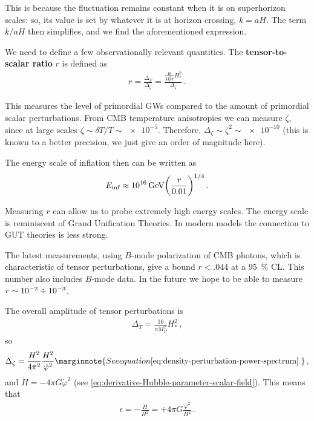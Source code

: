 \documentclass[main.tex]{subfiles}
\begin{document}
This is because the fluctuation remains constant when it is on superhorizon scales: so, its value is set by whatever it is at horizon crossing, \(k = aH\).
The term \(k / aH\) then simplifies, and we find the aforementioned expression.

We need to define a few observationally relevant quantities. 
The \textbf{tensor-to-scalar ratio} \(r\) is defined as 
%
\begin{align}
r = \frac{\Delta _T}{\Delta _\zeta }
= \frac{ \frac{16}{M_P^2 \pi } H^2_*}{\Delta _\zeta }
\,.
\end{align}

This measures the level of primordial GWs compared to the amount of primordial scalar perturbations. 
From CMB temperature anisotropies we can measure \(\zeta \), since at large scales \(\zeta \sim \delta T / T \sim \num{e-5}\). Therefore, \(\Delta_\zeta \sim \zeta^2 \sim \num{e-10}\) (this is known to a better precision, we just give an order of magnitude here).

The energy scale of inflation then can be written as 
%
\begin{align}
E _{\text{inf}} \approx \SI{e16}{GeV} \qty(\frac{r}{\num{.01}})^{1/4}
\,.
\end{align}

Measuring \(r\) can allow us to probe extremely high energy scales.
The energy scale is reminiscent of Grand Unification Theories. 
In modern models the connection to GUT theories is less strong.

The latest measurements, using \(B\)-mode polarization of CMB photons, which is characteristic of tensor perturbations, give a bound \(r < \num{.044}\) at a \SI{95}{\percent} CL. This number also includes \(B\)-mode data.
In the future we hope to be able to measure \(r \sim \num{e-2} \divisionsymbol \num{e-3}\). 

The overall amplitude of tensor perturbations is 
%
\begin{align}
\Delta _T = \frac{16}{\pi M_P^2} H^2_*
\,,
\end{align}
%
so 
%
\begin{align}
\Delta_{\zeta } = \frac{H^2}{4 \pi^2} \frac{H^2}{\dot{\varphi}^2} 
\marginnote{See equation \eqref{eq:density-perturbation-power-spectrum}.}
\,,
\end{align}
%
and \(\dot{H} = - 4 \pi G \dot{\varphi}^2\) (see \eqref{eq:derivative-Hubble-parameter-scalar-field}). 
This means that 
%
\begin{align}
\epsilon  = - \frac{\dot{H}}{H^2} = + 4 \pi G \frac{\dot{\varphi}^2}{H^2}
\,.
\end{align}
\end{document}
